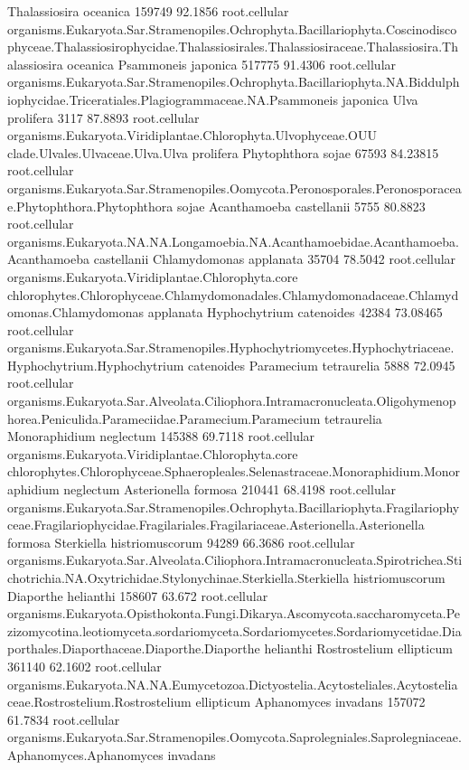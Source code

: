 \documentclass{article}
\begin{document}
\begin{Schunk}
\begin{Soutput}
 Thalassiosira oceanica 		 159749 92.1856 	 root.cellular organisms.Eukaryota.Sar.Stramenopiles.Ochrophyta.Bacillariophyta.Coscinodiscophyceae.Thalassiosirophycidae.Thalassiosirales.Thalassiosiraceae.Thalassiosira.Thalassiosira oceanica
 Psammoneis japonica 		 517775 91.4306 	 root.cellular organisms.Eukaryota.Sar.Stramenopiles.Ochrophyta.Bacillariophyta.NA.Biddulphiophycidae.Triceratiales.Plagiogrammaceae.NA.Psammoneis japonica
 Ulva prolifera 		 3117 87.8893 	 root.cellular organisms.Eukaryota.Viridiplantae.Chlorophyta.Ulvophyceae.OUU clade.Ulvales.Ulvaceae.Ulva.Ulva prolifera
 Phytophthora sojae 		 67593 84.23815 	 root.cellular organisms.Eukaryota.Sar.Stramenopiles.Oomycota.Peronosporales.Peronosporaceae.Phytophthora.Phytophthora sojae
 Acanthamoeba castellanii 		 5755 80.8823 	 root.cellular organisms.Eukaryota.NA.NA.Longamoebia.NA.Acanthamoebidae.Acanthamoeba.Acanthamoeba castellanii
 Chlamydomonas applanata 		 35704 78.5042 	 root.cellular organisms.Eukaryota.Viridiplantae.Chlorophyta.core chlorophytes.Chlorophyceae.Chlamydomonadales.Chlamydomonadaceae.Chlamydomonas.Chlamydomonas applanata
 Hyphochytrium catenoides 		 42384 73.08465 	 root.cellular organisms.Eukaryota.Sar.Stramenopiles.Hyphochytriomycetes.Hyphochytriaceae.Hyphochytrium.Hyphochytrium catenoides
 Paramecium tetraurelia 		 5888 72.0945 	 root.cellular organisms.Eukaryota.Sar.Alveolata.Ciliophora.Intramacronucleata.Oligohymenophorea.Peniculida.Parameciidae.Paramecium.Paramecium tetraurelia
 Monoraphidium neglectum 		 145388 69.7118 	 root.cellular organisms.Eukaryota.Viridiplantae.Chlorophyta.core chlorophytes.Chlorophyceae.Sphaeropleales.Selenastraceae.Monoraphidium.Monoraphidium neglectum
 Asterionella formosa 		 210441 68.4198 	 root.cellular organisms.Eukaryota.Sar.Stramenopiles.Ochrophyta.Bacillariophyta.Fragilariophyceae.Fragilariophycidae.Fragilariales.Fragilariaceae.Asterionella.Asterionella formosa
 Sterkiella histriomuscorum 		 94289 66.3686 	 root.cellular organisms.Eukaryota.Sar.Alveolata.Ciliophora.Intramacronucleata.Spirotrichea.Stichotrichia.NA.Oxytrichidae.Stylonychinae.Sterkiella.Sterkiella histriomuscorum
 Diaporthe helianthi 		 158607 63.672 	 root.cellular organisms.Eukaryota.Opisthokonta.Fungi.Dikarya.Ascomycota.saccharomyceta.Pezizomycotina.leotiomyceta.sordariomyceta.Sordariomycetes.Sordariomycetidae.Diaporthales.Diaporthaceae.Diaporthe.Diaporthe helianthi
 Rostrostelium ellipticum 		 361140 62.1602 	 root.cellular organisms.Eukaryota.NA.NA.Eumycetozoa.Dictyostelia.Acytosteliales.Acytosteliaceae.Rostrostelium.Rostrostelium ellipticum
 Aphanomyces invadans 		 157072 61.7834 	 root.cellular organisms.Eukaryota.Sar.Stramenopiles.Oomycota.Saprolegniales.Saprolegniaceae.Aphanomyces.Aphanomyces invadans

\end{Soutput}
\end{Schunk}
\end{document}
